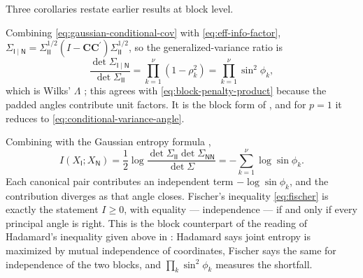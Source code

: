\documentclass{IEEEtran}
\begin{document}
Three corollaries restate earlier results at block level.

\begin{corollary}\label{cor:wilks}
  Combining \eqref{eq:gaussian-conditional-cov} with \eqref{eq:eff-info-factor}, $\Sigma_{\mathsf{I}\mid\mathsf{N}} = \Sigma_{\mathsf{II}}^{1/2}(I-\mathbf{C}\mathbf{C}^{\prime})\Sigma_{\mathsf{II}}^{1/2}$, so the generalized-variance ratio is
  \begin{equation}
    \frac{\det\Sigma_{\mathsf{I}\mid\mathsf{N}}}{\det\Sigma_{\mathsf{II}}}
    = \prod_{k=1}^{\nu}(1-\rho_{k}^{2})
    = \prod_{k=1}^{\nu}\sin^{2}\phi_{k} ,
    \label{eq:wilks}
  \end{equation}
  which is Wilks' $\Lambda$ \cite{wilks1932}; this agrees with \eqref{eq:block-penalty-product} because the padded angles contribute unit factors. It is the block form of , and for $p=1$ it reduces to \eqref{eq:conditional-variance-angle}.
\end{corollary}

\begin{corollary}\label{cor:mutual-info}
  Combining  with the Gaussian entropy formula \cite[Ch.~8]{cover2006},
  \begin{equation}
    I(X_{\mathsf{I}}; X_{\mathsf{N}})
    = \frac{1}{2}\log\frac{\det\Sigma_{\mathsf{II}}\det\Sigma_{\mathsf{NN}}}{\det\Sigma}
    = -\sum_{k=1}^{\nu}\log\sin\phi_{k} .
    \label{eq:mutual-info-angles}
  \end{equation}
  Each canonical pair contributes an independent term $-\log\sin\phi_{k}$, and the contribution diverges as that angle closes. Fischer's inequality \eqref{eq:fischer} is exactly the statement $I \ge 0$, with equality --- independence --- if and only if every principal angle is right. This is the block counterpart of the reading of Hadamard's inequality given above in : Hadamard says joint entropy is maximized by mutual independence of coordinates, Fischer says the same for independence of the two blocks, and $\prod_{k}\sin^{2}\phi_{k}$ measures the shortfall.
\end{corollary}
\end{document}

